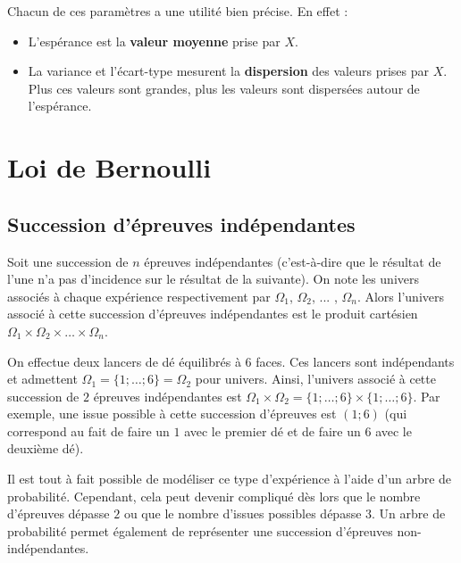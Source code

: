 	Chacun de ces paramètres a une utilité bien précise. En effet :
	
	\begin{formula}
		\entretitreetliste
		\begin{itemize}
			\item L'espérance est la \textbf{valeur moyenne} prise par $X$.
			\item La variance et l'écart-type mesurent la \textbf{dispersion} des valeurs prises par $X$. Plus ces valeurs sont grandes, plus les valeurs sont dispersées autour de l'espérance.
		\end{itemize}
	\end{formula}
	
	\section{Loi de Bernoulli}
	
	\subsection{Succession d'épreuves indépendantes}
	
	\begin{formula}
		Soit une succession de $n$ épreuves indépendantes (c'est-à-dire que le résultat de l'une n'a pas d'incidence sur le résultat de la suivante). On note les univers associés à chaque expérience respectivement par $\Omega_1$, $\Omega_2$, ... , $\Omega_n$.
		\newpar
		Alors l'univers associé à cette succession d'épreuves indépendantes est le produit cartésien $\Omega_1 \times \Omega_2 \times \dots \times \Omega_n$.
	\end{formula}
	
	\begin{tip}[Exemple]
		On effectue deux lancers de dé équilibrés à $6$ faces. Ces lancers sont indépendants et admettent $\Omega_1 = \{1; \dots; 6\} = \Omega_2$ pour univers.
		\newpar
		Ainsi, l'univers associé à cette succession de $2$ épreuves indépendantes est $\Omega_1 \times \Omega_2 = \{1; \dots; 6\} \times \{1; \dots; 6\}$.
		\newpar
		Par exemple, une issue possible à cette succession d'épreuves est $(1; 6)$ (qui correspond au fait de faire un $1$ avec le premier dé et de faire un $6$ avec le deuxième dé).
	\end{tip}
	
	\begin{tip}
		Il est tout à fait possible de modéliser ce type d'expérience à l'aide d'un arbre de probabilité. Cependant, cela peut devenir compliqué dès lors que le nombre d'épreuves dépasse $2$ ou que le nombre d'issues possibles dépasse $3$.
		\newpar
		Un arbre de probabilité permet également de représenter une succession d'épreuves non-indépendantes.
	\end{tip}
	
